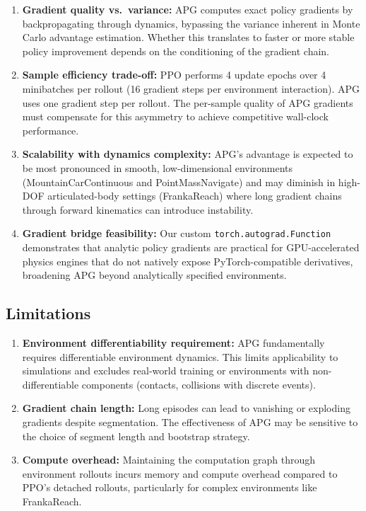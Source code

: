 \documentclass[11pt,a4paper]{article}
\begin{document}
\begin{enumerate}
  \item \textbf{Gradient quality vs.\ variance:} APG computes exact policy gradients by backpropagating through dynamics, bypassing the variance inherent in Monte Carlo advantage estimation. Whether this translates to faster or more stable policy improvement depends on the conditioning of the gradient chain.

  \item \textbf{Sample efficiency trade-off:} PPO performs 4 update epochs over 4 minibatches per rollout (16 gradient steps per environment interaction). APG uses one gradient step per rollout. The per-sample quality of APG gradients must compensate for this asymmetry to achieve competitive wall-clock performance.

  \item \textbf{Scalability with dynamics complexity:} APG's advantage is expected to be most pronounced in smooth, low-dimensional environments (MountainCarContinuous and PointMassNavigate) and may diminish in high-DOF articulated-body settings (FrankaReach) where long gradient chains through forward kinematics can introduce instability.

  \item \textbf{Gradient bridge feasibility:} Our custom \texttt{torch.autograd.Function} demonstrates that analytic policy gradients are practical for GPU-accelerated physics engines that do not natively expose PyTorch-compatible derivatives, broadening APG beyond analytically specified environments.
\end{enumerate}

\subsection{Limitations}
\label{sec:limitations}

\begin{enumerate}
  \item \textbf{Environment differentiability requirement:} APG fundamentally requires differentiable environment dynamics. This limits applicability to simulations and excludes real-world training or environments with non-differentiable components (contacts, collisions with discrete events).

  \item \textbf{Gradient chain length:} Long episodes can lead to vanishing or exploding gradients despite segmentation. The effectiveness of APG may be sensitive to the choice of segment length and bootstrap strategy.

  \item \textbf{Compute overhead:} Maintaining the computation graph through environment rollouts incurs memory and compute overhead compared to PPO's detached rollouts, particularly for complex environments like FrankaReach.
\end{enumerate}
\end{document}
